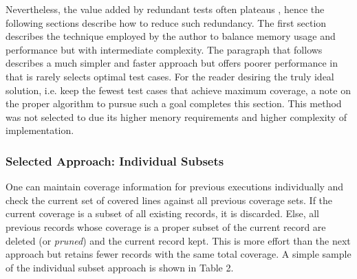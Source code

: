 Nevertheless, the value added by redundant tests often plateaus 
\cite{lemieux2023codamosa}, hence the following sections
describe how to reduce such redundancy.  The first section describes
the technique employed by the author to balance memory usage and performance but
with intermediate complexity. The paragraph that follows describes a much simpler and faster
approach but offers poorer performance in that is rarely selects optimal test 
cases.  For the reader desiring the truly ideal solution, i.e. keep the fewest test cases that achieve
maximum coverage, a note on the proper algorithm to pursue such a goal completes
this section. This method was not selected to due its higher menory
requirements and higher complexity of implementation.
 
\subsubsection{Selected Approach: Individual Subsets}\label{sec:tuning-2}
One can maintain coverage information for previous
executions individually and check the current set of covered lines
against all previous coverage sets.  If the current coverage is
a subset of all existing records, it is discarded.  
Else, all previous records whose coverage is 
a proper subset of the current record are deleted (or \textit{pruned})
and the current record kept. This is more effort than the next approach but
retains fewer records with the same total coverage.  
A simple sample of the individual subset approach is shown in Table 2.

